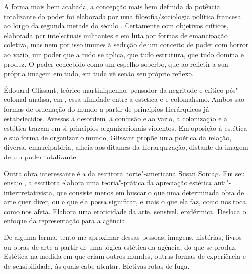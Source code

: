\begin{multicols}{2}
A forma mais bem acabada, a concepção mais bem definida da potência
totalizante do poder foi elaborada
por uma filosofia/sociologia
política francesa ao longo da segunda metade do século . Certamente
com objetivos críticos, elaborada por intelectuais militantes e em luta
por formas de emancipação coletiva, mas nem por isso imunes à sedução de
um conceito de poder com horror ao vazio, um poder que a tudo se aplica,
que tudo estrutura, que tudo domina e produz. O poder concebido como um 
espelho soberbo, que ao refletir a sua própria imagem em tudo, 
em tudo vê senão seu próprio reflexo.

Édouard Glissant, teórico martiniquenho, pensador da negritude e crítico
pós"-colonial analisa, em {}, essa afinidade
entre a estética e o colonialismo. Ambos são formas de ordenação do
mundo a partir de princípios hierárquicos já estabelecidos. Avessos à
desordem, à confusão e ao vazio, a colonização e a estética trazem em si
princípios organizacionais violentos. Em oposição à estética e sua forma
de organizar o mundo, Glissant propõe uma poética da relação, diversa,
emancipatória, alheia aos ditames da hierarquização, distante da imagem
de um poder totalizante.

Outra obra interessante é a da escritora norte"-americana Susan Sontag. 
Em seu ensaio {}, a escritora elabora 
uma teoria"-prática da apreciação estética
anti"-interpretativista, que consiste menos em buscar o que uma
determinada obra de arte quer dizer, ou o que ela possa significar, e
mais o que ela faz, como nos toca, como nos afeta. Elabora uma
eroticidade da arte, sensível, epidérmica. Desloca o enfoque da
representação para a agência.

De alguma forma, tento me aproximar dessas pessoas, imagens, histórias,
livros ou obras de arte a partir de uma lógica estética da agência, do
que se produz. Estética na medida em que criam outros mundos, outras
formas de experiência e de sensibilidade, às quais cabe atentar. Efetivas rotas de fuga.

\bigskip

\noindent{}\textcolor{gray}{\footnotesize{}}
\end{multicols}
